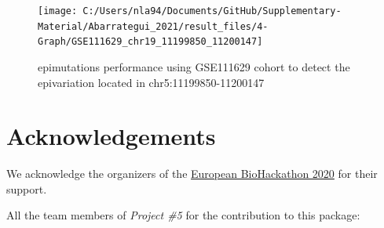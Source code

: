 \documentclass[
]{article}
\begin{document}
\begin{figure}

{\centering \texttt{[image: C:/Users/nla94/Documents/GitHub/Supplementary-Material/Abarrategui\_2021/result\_files/4-Graph/GSE111629\_chr19\_11199850\_11200147]} 

}

\caption{epimutations performance using GSE111629 cohort to detect the epivariation located in chr5:11199850-11200147}\label{fig:graph_GSE111629_4}
\end{figure}

\newpage

\hypertarget{acknowledgements}{%
\section{Acknowledgements}\label{acknowledgements}}

We acknowledge the organizers of the
\href{https://www.biohackathon-europe.org/}{European BioHackathon 2020}
for their support.

All the team members of \emph{Project \#5} for the contribution to this
package:
\end{document}
